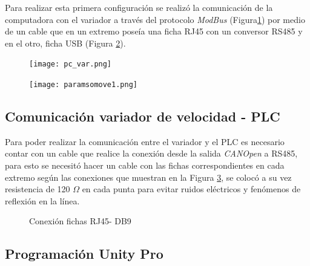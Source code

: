 Para realizar esta primera configuración se realizó la comunicación de la computadora con el variador a través del protocolo \textit{ModBus} (Figura\ref{fig:pcvar}) por medio de un cable que en un extremo poseía una ficha RJ45 con un conversor RS485 y en el otro, ficha USB (Figura \ref{fig:paramsomove1}). 
\begin{figure}[H]
	\centering
	\texttt{[image: pc\_var.png]}
	\label{fig:pcvar}
\end{figure}

\begin{figure}[H]
	\centering
	\texttt{[image: paramsomove1.png]}
	\label{fig:paramsomove1}
\end{figure}


\subsection{Comunicación variador de velocidad - PLC}
Para poder realizar la comunicación entre el variador y el PLC es necesario contar con un cable que realice la conexión desde la salida \textit{CANOpen} a RS485, para esto se necesitó hacer un cable con las fichas correspondientes en cada extremo según las conexiones que muestran en la Figura \ref{fig:cable}, se colocó a su vez resistencia de 120 $\Omega$ en cada punta para evitar ruidos eléctricos y fenómenos de reflexión en la línea.

\begin{figure}[htbp]
    \centering
    \caption{Conexión fichas RJ45- DB9} \label{fig:cable}
    \end{figure}



\subsection{Programación Unity Pro}


